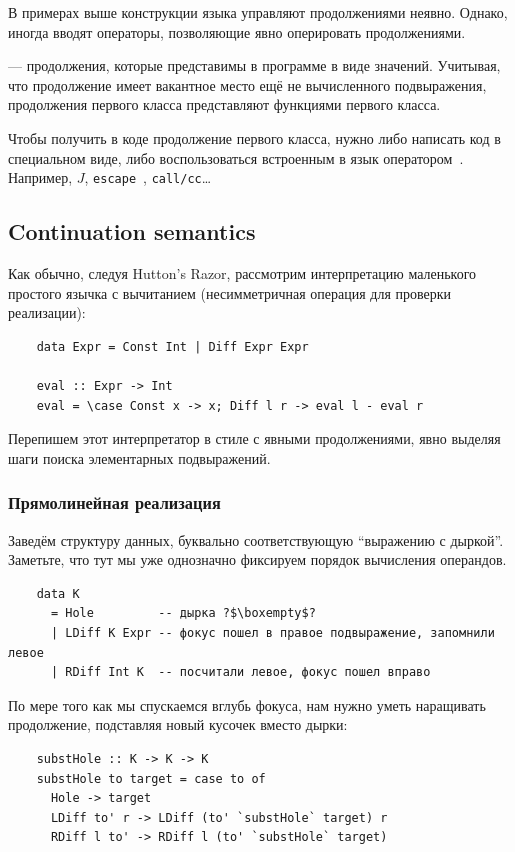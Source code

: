 В примерах выше конструкции языка управляют продолжениями неявно.
Однако, иногда вводят операторы, позволяющие явно оперировать продолжениями.

 --- продолжения, которые представимы в программе в виде значений.
Учитывая, что продолжение имеет вакантное место ещё не вычисленного подвыражения, продолжения первого класса представляют функциями первого класса.

Чтобы получить в коде продолжение первого класса, нужно либо написать код в специальном виде, либо воспользоваться встроенным в язык оператором~\cite[приложение A]{hillerstrom2022foundations}.
Например, $J$, \texttt{escape}~\cite{reynolds1972definitional}, \texttt{call/cc}\ldots %

\subsection{Continuation semantics} \label{subsec:definctionalized-cont}

Как обычно, следуя Hutton's Razor, рассмотрим интерпретацию маленького простого язычка с вычитанием (несимметричная операция для проверки реализации):
\begin{verbatim}
    data Expr = Const Int | Diff Expr Expr

    eval :: Expr -> Int
    eval = \case Const x -> x; Diff l r -> eval l - eval r
\end{verbatim}

Перепишем этот интерпретатор в стиле с явными продолжениями, явно выделяя шаги поиска элементарных подвыражений.


\subsubsection{Прямолинейная реализация}

Заведём структуру данных, буквально соответствующую ``выражению с дыркой''.
Заметьте, что тут мы уже однозначно фиксируем порядок вычисления операндов.
\begin{verbatim}
    data K
      = Hole         -- дырка ?$\boxempty$?
      | LDiff K Expr -- фокус пошел в правое подвыражение, запомнили левое
      | RDiff Int K  -- посчитали левое, фокус пошел вправо
\end{verbatim}

По мере того как мы спускаемся вглубь фокуса, нам нужно уметь наращивать продолжение, подставляя новый кусочек вместо дырки:
\begin{verbatim}
    substHole :: K -> K -> K
    substHole to target = case to of
      Hole -> target
      LDiff to' r -> LDiff (to' `substHole` target) r
      RDiff l to' -> RDiff l (to' `substHole` target)
\end{verbatim}

